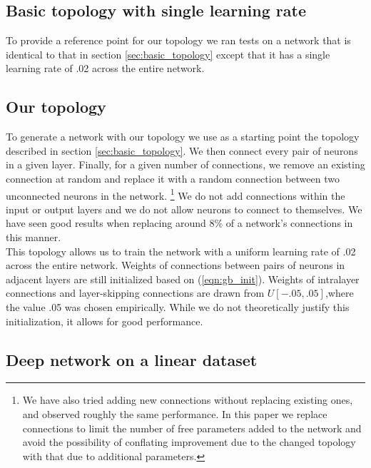 \documentclass{article}
\newcommand{\npar}{\\\indent}
\begin{document}
\subsection{Basic topology with single learning rate}
\label{sec:basic_topology_uniform}

To provide a reference point for our topology we ran tests on a network that is identical to that in section \ref{sec:basic_topology} except that it has a single learning rate of .02 across the entire network.

\subsection{Our topology}
\label{sec:our_topology}

To generate a network with our topology we use as a starting point the topology described in section \ref{sec:basic_topology}. We then connect every pair of neurons in a given layer. Finally, for a given number of connections, we remove an existing connection at random and replace it with a random connection between two unconnected neurons in the network. \footnote{We have also tried adding new connections without replacing existing ones, and observed roughly the same performance. In this paper we replace connections to limit the number of free parameters added to the network and avoid the possibility of conflating improvement due to the changed topology with that due to additional parameters.} We do not add connections within the input or output layers and we do not allow neurons to connect to themselves. We have seen good results when replacing around $8\%$ of a network's connections in this manner.
\npar
This topology allows us to train the network with a uniform learning rate of .02 across the entire network. Weights of connections between pairs of neurons in adjacent layers are still initialized based on (\ref{eqn:gb_init}). Weights of intralayer connections and layer-skipping connections are drawn from $U[-.05,.05]$,where the value .05 was chosen empirically. While we do not theoretically justify this initialization, it allows for good performance.

\subsection{Deep network on a linear dataset}
\label{sec:linear_implementation}
\end{document}
